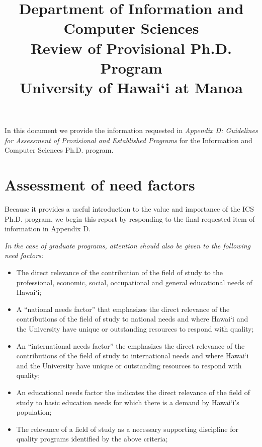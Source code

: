 \documentclass[12pt]{article}
\begin{document}
\title{
       Department of Information and Computer Sciences\\
       {\bf Review of Provisional Ph.D. Program} \\
       University of Hawai`i at Manoa}

\maketitle

\tableofcontents

\newpage

In this document we provide the information requested in {\em Appendix D:
Guidelines for Assessment of Provisional and Established Programs} for the
Information and Computer Sciences Ph.D. program.

\section{Assessment of need factors}

Because it provides a useful introduction to the value and importance of the ICS
Ph.D. program, we begin this report by responding to the final requested
item of information in Appendix D.

{\em
\medskip \noindent In the case of graduate programs, attention should also be given to the
following need factors:
\begin{itemize}
\item The direct relevance of the contribution of the field of study to the
  professional, economic, social, occupational and general educational
  needs of Hawai`i; 
\item A ``national needs factor'' that emphasizes the direct relevance of
  the contributions of the field of study to national needs and where
  Hawai`i and the University have unique or outstanding resources to
  respond with quality;
\item An ``international needs factor'' the emphasizes the direct relevance of
  the contributions of the field of study to international needs and where
  Hawai`i and the University have unique or outstanding resources to
  respond with quality;
\item An educational needs factor the indicates the direct relevance of the
  field of study to basic education needs for which there is a demand by
  Hawai`i's population;
\item The relevance of a field of study as a necessary supporting
  discipline for quality programs identified by the above criteria;
\end{itemize}
}
\end{document}
